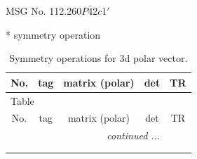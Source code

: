 \documentclass[fleqn,8pt]{jsarticle}
\begin{document}
\setcounter{MaxMatrixCols}{32}

\renewcommand{\tablename}{Table~}
\renewcommand{\figurename}{Figure~}
\begin{center}
\LARGE
MSG No. 112.260\quad$P\bar{4}2c1'$
\end{center}
* symmetry operation
\renewcommand{\arraystretch}{1.3}
\begin{longtable}{ccccc}
\caption{Symmetry operations for 3d polar vector.}
 \\
 \hline \hline
No. & tag & matrix (polar) & det & TR \\ \hline \endfirsthead

\multicolumn{4}{l}{\tablename\ \thetable{}} \\
 \hline \hline
No. & tag & matrix (polar) & det & TR \\ \hline \endhead

 \hline \hline
\multicolumn{4}{r}{\footnotesize\it continued ...} \\ \endfoot

 \hline \hline
\multicolumn{4}{r}{} \\ \endlastfoot


\end{longtable}
\end{document}
